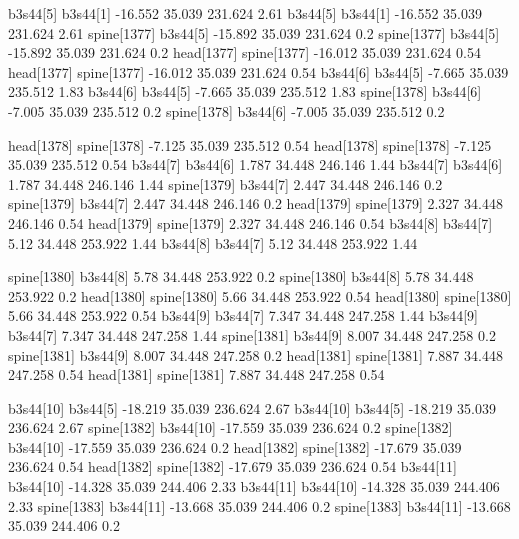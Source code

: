 b3s44[5]    b3s44[1]    -16.552    35.039    231.624    2.61
b3s44[5]    b3s44[1]    -16.552    35.039    231.624    2.61
spine[1377]    b3s44[5]    -15.892    35.039    231.624    0.2
spine[1377]    b3s44[5]    -15.892    35.039    231.624    0.2
head[1377]    spine[1377]    -16.012    35.039    231.624    0.54
head[1377]    spine[1377]    -16.012    35.039    231.624    0.54
b3s44[6]    b3s44[5]    -7.665    35.039    235.512    1.83
b3s44[6]    b3s44[5]    -7.665    35.039    235.512    1.83
spine[1378]    b3s44[6]    -7.005    35.039    235.512    0.2
spine[1378]    b3s44[6]    -7.005    35.039    235.512    0.2


head[1378]    spine[1378]    -7.125    35.039    235.512    0.54
head[1378]    spine[1378]    -7.125    35.039    235.512    0.54
b3s44[7]    b3s44[6]    1.787    34.448    246.146    1.44
b3s44[7]    b3s44[6]    1.787    34.448    246.146    1.44
spine[1379]    b3s44[7]    2.447    34.448    246.146    0.2
spine[1379]    b3s44[7]    2.447    34.448    246.146    0.2
head[1379]    spine[1379]    2.327    34.448    246.146    0.54
head[1379]    spine[1379]    2.327    34.448    246.146    0.54
b3s44[8]    b3s44[7]    5.12    34.448    253.922    1.44
b3s44[8]    b3s44[7]    5.12    34.448    253.922    1.44


spine[1380]    b3s44[8]    5.78    34.448    253.922    0.2
spine[1380]    b3s44[8]    5.78    34.448    253.922    0.2
head[1380]    spine[1380]    5.66    34.448    253.922    0.54
head[1380]    spine[1380]    5.66    34.448    253.922    0.54
b3s44[9]    b3s44[7]    7.347    34.448    247.258    1.44
b3s44[9]    b3s44[7]    7.347    34.448    247.258    1.44
spine[1381]    b3s44[9]    8.007    34.448    247.258    0.2
spine[1381]    b3s44[9]    8.007    34.448    247.258    0.2
head[1381]    spine[1381]    7.887    34.448    247.258    0.54
head[1381]    spine[1381]    7.887    34.448    247.258    0.54


b3s44[10]    b3s44[5]    -18.219    35.039    236.624    2.67
b3s44[10]    b3s44[5]    -18.219    35.039    236.624    2.67
spine[1382]    b3s44[10]    -17.559    35.039    236.624    0.2
spine[1382]    b3s44[10]    -17.559    35.039    236.624    0.2
head[1382]    spine[1382]    -17.679    35.039    236.624    0.54
head[1382]    spine[1382]    -17.679    35.039    236.624    0.54
b3s44[11]    b3s44[10]    -14.328    35.039    244.406    2.33
b3s44[11]    b3s44[10]    -14.328    35.039    244.406    2.33
spine[1383]    b3s44[11]    -13.668    35.039    244.406    0.2
spine[1383]    b3s44[11]    -13.668    35.039    244.406    0.2



